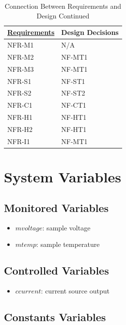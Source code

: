\documentclass[12pt, titlepage]{article}
\begin{document}
\begin{table}[H]
	\centering
	\caption{Connection Between Requirements and Design Continued}
	\label{my-label}
	\begin{tabular}{p{} p{}}
		\hline
		\textbf{\href{https://github.com/edwin-do/capstoneTeam30/blob/main/docs/SRS/SRS.pdf}{Requirements}} & \textbf{Design Decisions} \\ \hline
         NFR-M1 & N/A \\ \hline
	    NFR-M2 & NF-MT1 \\ \hline
	    NFR-M3 & NF-MT1 \\ \hline
	    NFR-S1 & NF-ST1 \\ \hline
	    NFR-S2 & NF-ST2 \\ \hline
	    NFR-C1 & NF-CT1 \\ \hline
	    NFR-H1 & NF-HT1 \\ \hline
	    NFR-H2 & NF-HT1 \\ \hline
	    NFR-I1 & NF-MT1 \\ \hline
	\end{tabular}
\end{table}

\newpage

\section{System Variables}


\subsection{Monitored Variables}
	\begin{itemize}
		\item $m$\textunderscore $voltage$: sample voltage
		\item $m$\textunderscore $temp$: sample temperature
	\end{itemize}

\subsection{Controlled Variables}
\begin{itemize}
		\item $c$\textunderscore $current$: current source output
	\end{itemize}

\subsection{Constants Variables}
\end{document}
